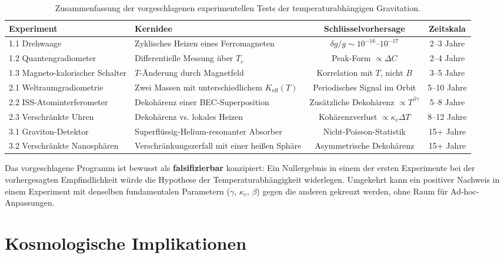 \documentclass[12pt]{article}
\theoremstyle{remark}
\newcommand{\Keff}{K_{\mathrm{eff}}}
\begin{document}
	\begin{table}[htbp]
		\centering
		\caption{Zusammenfassung der vorgeschlagenen experimentellen Tests der temperaturabhängigen Gravitation.}
		\label{tab:experiment-summary}
		\small
		\begin{tabularx}{\textwidth}{l X c c}
			\toprule
			\textbf{Experiment} & \textbf{Kernidee} & \textbf{Schlüsselvorhersage} & \textbf{Zeitskala} \\
			\midrule
			1.1 Drehwaage & Zyklisches Heizen eines Ferromagneten & \(\delta g/g \sim 10^{-16}\)–\(10^{-17}\) & 2–3 Jahre \\
			1.2 Quantengradiometer & Differentielle Messung über \(T_c\) & Peak-Form \(\propto \Delta C\) & 2–4 Jahre \\
			1.3 Magneto-kalorischer Schalter & \(T\)-Änderung durch Magnetfeld & Korrelation mit \(T\), nicht \(B\) & 3–5 Jahre \\
			2.1 Weltraumgradiometrie & Zwei Massen mit unterschiedlichem \(\Keff(T)\) & Periodisches Signal im Orbit & 5–10 Jahre \\
			2.2 ISS-Atominterferometer & Dekohärenz einer BEC-Superposition & Zusätzliche Dekohärenz \(\propto T^{\beta\gamma}\) & 5–8 Jahre \\
			2.3 Verschränkte Uhren & Dekohärenz vs. lokales Heizen & Kohärenzverlust \(\propto \kappa_c \Delta T\) & 8–12 Jahre \\
			3.1 Graviton-Detektor & Superflüssig-Helium-resonanter Absorber & Nicht-Poisson-Statistik & 15+ Jahre \\
			3.2 Verschränkte Nanosphären & Verschränkungszerfall mit einer heißen Sphäre & Asymmetrische Dekohärenz & 15+ Jahre \\
			\bottomrule
		\end{tabularx}
	\end{table}
	
	Das vorgeschlagene Programm ist bewusst als \textbf{falsifizierbar} konzipiert: Ein Nullergebnis in einem der ersten Experimente bei der vorhergesagten Empfindlichkeit würde die Hypothese der Temperaturabhängigkeit widerlegen. Umgekehrt kann ein positiver Nachweis in einem Experiment mit denselben fundamentalen Parametern (\(\gamma\), \(\kappa_c\), \(\beta\)) gegen die anderen gekreuzt werden, ohne Raum für Ad-hoc-Anpassungen.
	
	
	\section{Kosmologische Implikationen}
	\label{sec:cosmo}
	
\end{document}
